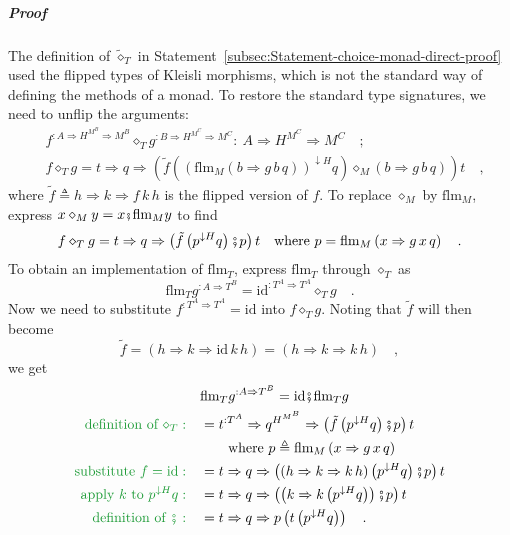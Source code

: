 \subparagraph{Proof}

The definition of $\tilde{\diamond}_{T}$ in Statement~\ref{subsec:Statement-choice-monad-direct-proof}
used the flipped types of Kleisli morphisms, which is not the standard
way of defining the methods of a monad. To restore the standard type
signatures, we need to unflip the arguments:
\begin{align*}
 & f^{:A\Rightarrow H^{M^{B}}\Rightarrow M^{B}}\diamond_{T}g^{:B\Rightarrow H^{M^{C}}\Rightarrow M^{C}}:\ A\Rightarrow H^{M^{C}}\Rightarrow M^{C}\quad;\\
 & f\diamond_{T}g=t\Rightarrow q\Rightarrow\left(\tilde{f}\left(\left(\text{flm}_{M}\left(b\Rightarrow g\,b\,q\right)\right)^{\downarrow H}q\right)\diamond_{M}\left(b\Rightarrow g\,b\,q\right)\right)t\quad,
\end{align*}
where $\tilde{f}\triangleq h\Rightarrow k\Rightarrow f\,k\,h$ is
the flipped version of $f$. To replace $\diamond_{M}$ by $\text{flm}_{M}$,
express $x\diamond_{M}y=x\bef\text{flm}_{M}y$ to find
\[
f\diamond_{T}g=t\Rightarrow q\Rightarrow\left(\tilde{f}\left(p^{\downarrow H}q\right)\bef p\right)t\quad\text{where }p=\text{flm}_{M}\left(x\Rightarrow g\,x\,q\right)\quad.
\]
To obtain an implementation of $\text{flm}_{T}$, express $\text{flm}_{T}$
through $\diamond_{T}$ as 
\[
\text{flm}_{T}g^{:A\Rightarrow T^{B}}=\text{id}^{:T^{A}\Rightarrow T^{A}}\diamond_{T}g\quad.
\]
Now we need to substitute $f^{:T^{A}\Rightarrow T^{A}}=\text{id}$
into $f\diamond_{T}g$. Noting that $\tilde{f}$ will then become
\[
\tilde{f}=\left(h\Rightarrow k\Rightarrow\text{id}\,k\,h\right)=\left(h\Rightarrow k\Rightarrow k\,h\right)\quad,
\]
we get
\begin{align*}
 & \text{flm}_{T}g^{:A\Rightarrow T^{B}}=\text{id}\bef\text{flm}_{T}g\\
{\color{greenunder}\text{definition of }\diamond_{T}:}\quad & =t^{:T^{A}}\Rightarrow q^{H^{M^{B}}}\Rightarrow\left(\tilde{f}\left(p^{\downarrow H}q\right)\bef p\right)t\\
 & \quad\quad\text{where }p\triangleq\text{flm}_{M}\left(x\Rightarrow g\,x\,q\right)\\
{\color{greenunder}\text{substitute }f=\text{id}:}\quad & =t\Rightarrow q\Rightarrow\left(\left(h\Rightarrow k\Rightarrow k\,h\right)\left(p^{\downarrow H}q\right)\bef p\right)t\\
{\color{greenunder}\text{apply }k\text{ to }p^{\downarrow H}q:}\quad & =t\Rightarrow q\Rightarrow\left(\left(k\Rightarrow k\left(p^{\downarrow H}q\right)\right)\bef p\right)t\\
{\color{greenunder}\text{definition of }\bef:}\quad & =t\Rightarrow q\Rightarrow p\left(t\left(p^{\downarrow H}q\right)\right)\quad.
\end{align*}
